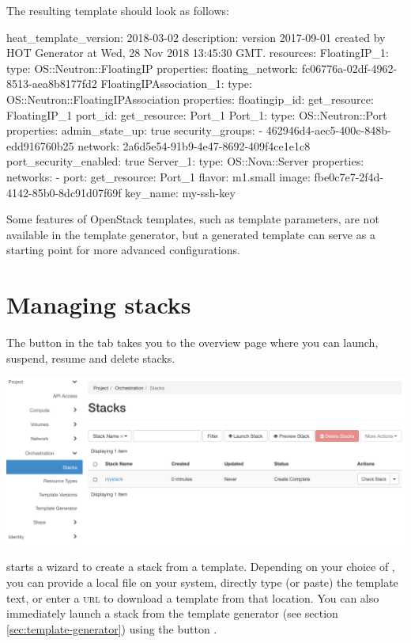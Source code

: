 The resulting template should look as follows:

\begin{code}{}
heat_template_version: 2018-03-02
description: version 2017-09-01 created by HOT Generator at Wed, 28 Nov 2018 13:45:30 GMT.
resources:
  FloatingIP_1:
    type: OS::Neutron::FloatingIP
    properties:
      floating_network: fc06776a-02df-4962-8513-aea8b8177fd2
  FloatingIPAssociation_1:
    type: OS::Neutron::FloatingIPAssociation
    properties:
      floatingip_id: { get_resource: FloatingIP_1 }
      port_id: { get_resource: Port_1 }
  Port_1:
    type: OS::Neutron::Port
    properties:
      admin_state_up: true
      security_groups:
        - 462946d4-aec5-400c-848b-edd916760b25
      network: 2a6d5e54-91b9-4e47-8692-409f4ce1e1c8
      port_security_enabled: true
  Server_1:
    type: OS::Nova::Server
    properties:
      networks:
        - port: { get_resource: Port_1 }
      flavor: m1.small
      image: fbe0c7e7-2f4d-4142-85b0-8dc91d07f69f
      key_name: my-ssh-key
\end{code}

Some features of OpenStack templates, such as template parameters, are
not available in the template generator, but a generated template can
serve as a starting point for more advanced configurations.

\section{Managing stacks}
The  button in the  tab takes you
to the overview page where you can launch, suspend, resume and delete
stacks.
\begin{center}
  \includegraphics[width=\textwidth]{img/stacks_overview}
\end{center}

 starts a wizard to create a stack from a
template.  Depending on your choice of , you
can provide a local file on your system, directly type (or paste) the
template text, or enter a \textsc{url} to download a template from
that location.  You can also immediately launch a stack from the
template generator (see section \ref{sec:template-generator}) using
the button .


